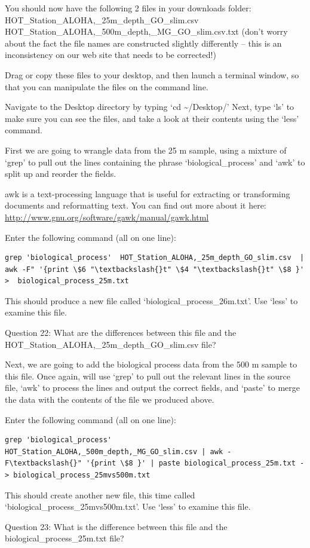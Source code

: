 You should now have the following 2 files in your downloads folder: HOT\_Station\_ALOHA,\_25m\_depth\_GO\_slim.csv
HOT\_Station\_ALOHA,\_500m\_depth,\_MG\_GO\_slim.csv.txt
(don’t worry about the fact the file names are constructed slightly differently – this is an inconsistency on our web site that needs to be corrected!)

\begin{steps}
Drag or copy these files to your desktop, and then launch a terminal window, so that you can manipulate the files on the command line.
  
Navigate to the Desktop directory by typing ‘cd \textasciitilde{}/Desktop/’   Next, type ‘ls’ to make sure you can see the files, and take a look at their contents using the ‘less’ command.
\end{steps}

First we are going to wrangle data from the 25 m sample, using a mixture of ‘grep’ to pull out the lines containing the phrase ‘biological\_process’ and ‘awk’ to split up and reorder the fields. 

awk is a text-processing language that is useful for extracting or transforming documents and reformatting text. You can find out more about it here: \url{http://www.gnu.org/software/gawk/manual/gawk.html}

\begin{steps}
Enter the following command (all on one line):
\begin{lstlisting}
grep 'biological_process'  HOT_Station_ALOHA,_25m_depth_GO_slim.csv  | awk -F" '{print \$6 "\textbackslash{}t" \$4 "\textbackslash{}t" \$8 }'  >  biological_process_25m.txt

\end{lstlisting}
This should produce a new file called ‘biological\_process\_26m.txt’. Use ‘less’ to examine this file.

Question 22: What are the differences between this file and the HOT\_Station\_ALOHA,\_25m\_depth\_GO\_slim.csv file?

\end{steps}

Next, we are going to add the biological process data from the 500 m sample to this file.  Once again, will use ‘grep’ to pull out the relevant lines in the source file, ‘awk’ to process the lines and output the correct fields, and ‘paste’ to merge the data with the contents of the file we produced above.

\begin{steps}
Enter the following command (all on one line):
\begin{lstlisting}
grep 'biological_process' HOT_Station_ALOHA,_500m_depth,_MG_GO_slim.csv | awk -F\textbackslash{}" '{print \$8 }' | paste biological_process_25m.txt - > biological_process_25mvs500m.txt

\end{lstlisting}
This should create another new file, this time called ‘biological\_process\_25mvs500m.txt’. Use ‘less’ to examine this file.
  
Question 23: What is the difference between this file and the biological\_process\_25m.txt file?
\end{steps}

